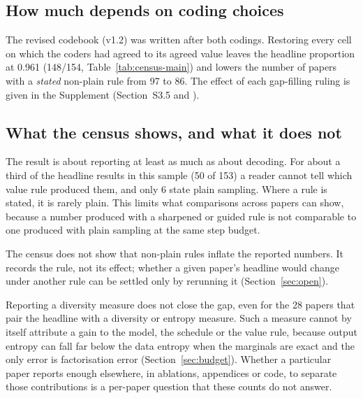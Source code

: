 \subsection{How much depends on coding choices}
\label{sec:census-sensitivity}
The revised codebook (v1.2) was written after both codings. Restoring every cell on which the coders had agreed to its agreed value leaves the headline proportion at 0.961 (148/154, Table~\ref{tab:census-main}) and lowers the number of papers with a \emph{stated} non-plain rule from 97 to 86. The effect of each gap-filling ruling is given in the Supplement (Section~S3.5 and \suppTabGap{}).%

\subsection{What the census shows, and what it does not}
\label{sec:census-reading}

The result is about reporting at least as much as about decoding. For about a third of the headline results in this sample (50 of 153) a reader cannot tell which value rule produced them, and only 6 state plain sampling. Where a rule is stated, it is rarely plain. This limits what comparisons across papers can show, because a number produced with a sharpened or guided rule is not comparable to one produced with plain sampling at the same step budget.

The census does not show that non-plain rules inflate the reported numbers. It records the rule, not its effect; whether a given paper's headline would change under another rule can be settled only by rerunning it (Section~\ref{sec:open}).

Reporting a diversity measure does not close the gap, even for the 28 papers that pair the headline with a diversity or entropy measure. Such a measure cannot by itself attribute a gain to the model, the schedule or the value rule, because output entropy can fall far below the data entropy when the marginals are exact and the only error is factorisation error (Section~\ref{sec:budget}). %
Whether a particular paper reports enough elsewhere, in ablations, appendices or code, to separate those contributions is a per-paper question that these counts do not answer. %

